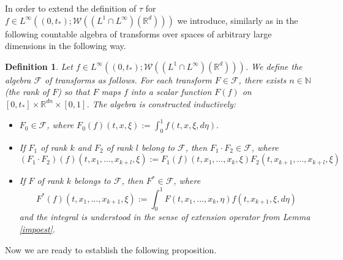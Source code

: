 \documentclass[10pt]{article}
\newtheorem{defi}{Definition}
\newcommand{\R}{\mathbb{R}}
\newcommand{\izj}{\int_{0}^{1}}
\newcommand{\W}{\mathcal{W}}
\begin{document}
In order to extend the definition of $\tau$ for $f\in L^\infty((0,t_{*});\mathcal{W}((L^1\cap L^{\infty})(\R^d)))$ we introduce, similarly as in \cite{JPS2025} the following countable algebra  of
transforms over spaces of arbitrary large dimensions in the following way.
\begin{defi}\label{defalgebra}
Let $f \in L^{\infty}((0,t_{*});\W((L^1\cap L^{\infty})(\R^d)))$. We define the algebra $\mathcal{F}$ of transforms as follows. For each transform $F \in \mathcal{F}$,
there exists  $n \in \mathbb{N}$ (the rank of $F$) so that $F$ maps $f$ into a scalar function $F(f)$
on $[0,t_{*}]\times\R^{dn} \times [0, 1]$. The algebra is constructed inductively:
\begin{itemize}
    \item $F_0 \in \mathcal{F}$, where  $F_0(f)(t,x,\xi):=\izj f(t,x,\xi,d\eta).$
    \item If $F_1$ of rank $k$ and $F_2$ of rank $l$ belong to $\mathcal{F}$, then $F_1\cdot F_2 \in \mathcal{F}$, where
    \[
    (F_{1}\cdot F_2)(f)(t,x_1,\dots,x_{k+l},\xi):=F_1(f)(t,x_1,\dots,x_k,\xi)F_2(t,x_{k+1},\dots,x_{k+l},\xi) 
    \]
    \item If $F$ of rank $k$ belongs to $\mathcal{F}$, then $F^{*} \in \mathcal{F}$, where 
    \[
    F^{*}(f)(t,x_1,\dots,x_{k+1},\xi):=\izj F(t,x_1,\dots,x_k,\eta)f(t,x_{k+1},\xi,d \eta)
    \]
   and  the integral is understood in the sense of extension operator from Lemma \ref{impoest}. 
\end{itemize}
\end{defi}



Now we are ready to establish the following proposition.
\end{document}
